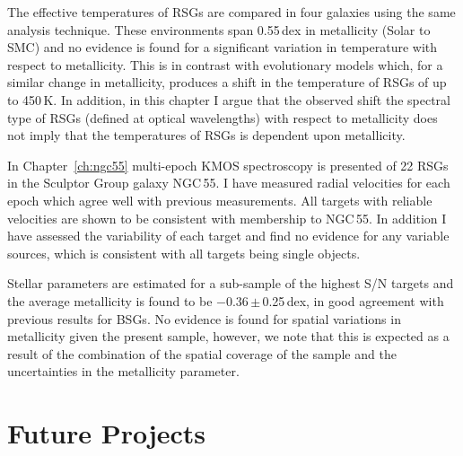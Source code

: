 The effective temperatures of RSGs are compared in four galaxies using the same analysis technique.
These environments span 0.55\,dex in metallicity (Solar to SMC) and no evidence is found for a significant variation in temperature with respect to metallicity.
This is in contrast with evolutionary models which, for a  similar change in metallicity, produces a shift in the temperature of RSGs of up to 450\,K.
In addition, in this chapter I argue that the observed shift the spectral type of RSGs (defined at optical wavelengths) with respect to metallicity does not imply that the temperatures of RSGs is dependent upon metallicity.


In Chapter~\ref{ch:ngc55} multi-epoch KMOS spectroscopy is presented of 22 RSGs in the Sculptor Group galaxy NGC\,55.
I have measured radial velocities for each epoch which agree well with previous measurements.
All targets with reliable velocities are shown to be consistent with membership to NGC\,55.
In addition I have assessed the variability of each target and find no evidence for any variable sources, which is consistent with all targets being single objects.

Stellar parameters are estimated for a sub-sample of the highest S/N targets and the average metallicity is found to be $-$0.36\,$\pm$\,0.25\,dex, in good agreement with previous results for BSGs.
No evidence is found for spatial variations in metallicity given the present sample, however, we note that this is expected as a result of the combination of the spatial coverage of the sample and the uncertainties in the metallicity parameter.


\section{Future Projects} %
\label{sec:future_projects}

